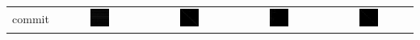 \documentclass{article}
\begin{document}
\begin{table}[h]
\begin{tabular}{l | c c c c}
\hline
commit
&
    \includegraphics[width=0.23\textwidth]{../img/commit/adjacency-matrix-random-ordering.png}
& 
    \includegraphics[width=0.23\textwidth]{../img/commit/adjacency-matrix-given-ordering.png}
& 
    \includegraphics[width=0.23\textwidth]{../img/commit/adjacency-matrix-degree-ordering.png}
& 
    \includegraphics[width=0.23\textwidth]{../img/commit/adjacency-matrix-slashburn-ordering.png} \\


\end{tabular}
\end{table}
\end{document}
